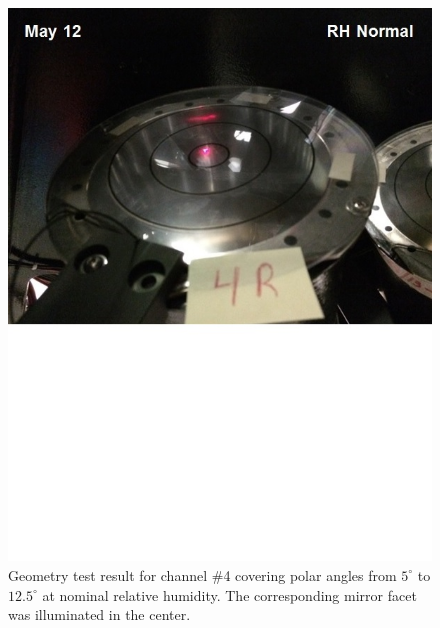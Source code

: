 \begin{figure}[ht]
    \centering
    \includegraphics[width=1.0\linewidth,trim={0 8.5cm 0 0},clip]{images/GEO_TEST_4_Normal.jpg}
    \caption{Geometry test result for channel \#4 covering polar angles from $5^\circ$ to $12.5^\circ$ at
      nominal relative humidity. The corresponding mirror facet was illuminated in the center.}
    \label{fig:GEO_TEST_4_Normal}
\end{figure}

